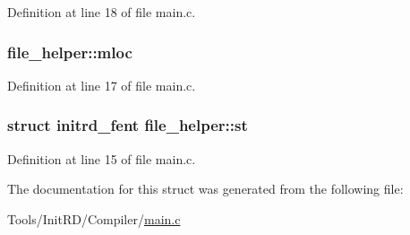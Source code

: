 Definition at line 18 of file main.c.

\hypertarget{structfile__helper_a25ca843744b9953f3ea3a5e5ac2a3aaf}{
\subsubsection[{mloc}]{ {\bf file\_\-helper::mloc}}}
\label{structfile__helper_a25ca843744b9953f3ea3a5e5ac2a3aaf}


Definition at line 17 of file main.c.

\hypertarget{structfile__helper_a309aeca7d79673c8f4fd8aaecbfa113b}{
\subsubsection[{st}]{\setlength{\rightskip}{0pt plus 5cm}struct {\bf initrd\_\-fent} {\bf file\_\-helper::st}}}
\label{structfile__helper_a309aeca7d79673c8f4fd8aaecbfa113b}


Definition at line 15 of file main.c.



The documentation for this struct was generated from the following file:\begin{DoxyCompactItemize}
\item 
Tools/InitRD/Compiler/\hyperlink{Tools_2InitRD_2Compiler_2main_8c}{main.c}\end{DoxyCompactItemize}
